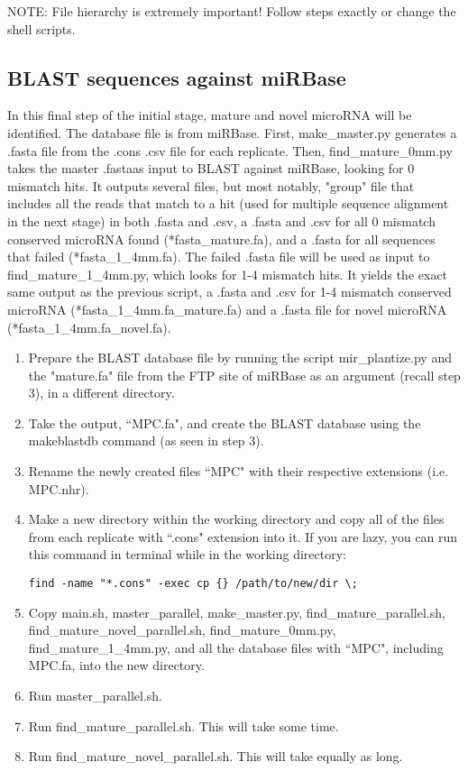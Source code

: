 \documentclass[12pt,titlepage]{article}
\begin{document}
\noindent NOTE: File hierarchy is extremely important! Follow steps exactly or change the shell scripts. 

\subsection{BLAST sequences against miRBase}
In this final step of the initial stage, mature and novel microRNA will be identified. The database file is from miRBase. First, make\_master.py generates a .fasta file from the .cons .csv file for each replicate. Then, find\_mature\_0mm.py takes the master .fastaas input to BLAST against miRBase, looking for 0 mismatch hits. It outputs several files, but most notably, "group" file that includes all the reads that match to a hit (used for multiple sequence alignment in the next stage) in both .fasta and .csv, a .fasta and .csv for all 0 mismatch conserved microRNA found (*fasta\_mature.fa), and a .fasta for all sequences that failed (*fasta\_1\_4mm.fa). The failed .fasta file will be used as input to find\_mature\_1\_4mm.py, which looks for 1-4 mismatch hits. It yields the exact same output as the previous script, a .fasta and .csv for 1-4 mismatch conserved microRNA (*fasta\_1\_4mm.fa\_mature.fa) and a .fasta file for novel microRNA (*fasta\_1\_4mm.fa\_novel.fa).
\begin{enumerate}
\item Prepare the BLAST database file by running the script mir\_plantize.py and the "mature.fa" file from the FTP site of miRBase as an argument (recall step 3), in a different directory.
\item Take the output, ``MPC.fa", and create the BLAST database using the makeblastdb command (as seen in step 3).
\item Rename the newly created files ``MPC" with their respective extensions (i.e. MPC.nhr).
\item Make a new directory within the working directory and copy all of the files from each replicate with ``.cons" extension into it. If you are lazy, you can run this command in terminal while in the working directory: 
\begin{tcolorbox}
\begin{lstlisting}
find -name "*.cons" -exec cp {} /path/to/new/dir \; 
\end{lstlisting}
\end{tcolorbox}
\item Copy main.sh, master\_parallel, make\_master.py, find\_mature\_parallel.sh, find\_mature\_novel\_parallel.sh, find\_mature\_0mm.py, find\_mature\_1\_4mm.py, and all the database files with ``MPC", including MPC.fa, into the new directory.
\item Run master\_parallel.sh.
\item Run find\_mature\_parallel.sh. This will take some time.
\item Run find\_mature\_novel\_parallel.sh. This will take equally as long.
\end{enumerate}
\end{document}

